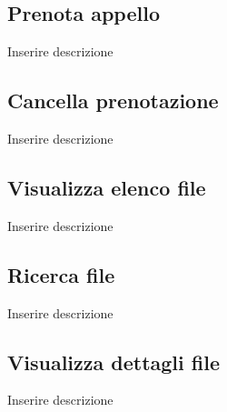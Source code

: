 
\begin{figure}
	\subsection{Prenota appello}
	\centering
	\caption{Inserire descrizione}
	\label{fig:prova}
\end{figure}


\begin{figure}
	\subsection{Cancella prenotazione}
	\centering
	\caption{Inserire descrizione}
	\label{fig:prova}
\end{figure}


\begin{figure}
	\subsection{Visualizza elenco file }
	\centering
	\caption{Inserire descrizione}
	\label{fig:prova}
\end{figure}


\begin{figure}
	\subsection{Ricerca file}
	\centering
	\caption{Inserire descrizione}
	\label{fig:prova}
\end{figure}


\begin{figure}
	\subsection{ Visualizza dettagli file}
	\centering
	\caption{Inserire descrizione}
	\label{fig:prova}
\end{figure}

